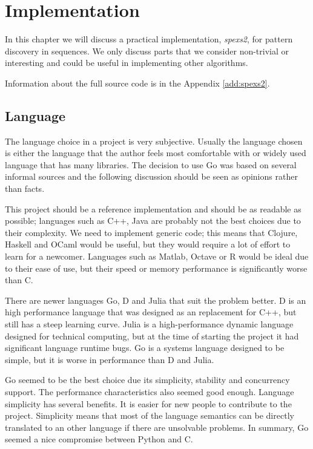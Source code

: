 \chapter{Implementation}
\label{c:implementation}

In this chapter we will discuss a practical implementation, \emph{spexs2}, for pattern discovery in sequences. We only discuss parts that we consider non-trivial or interesting and could be useful in implementing other algorithms.

Information about the full source code is in the Appendix \ref{add:spexs2}.

\section{Language}

The language choice in a project is very subjective. Usually the language chosen is either the language that the author feels most comfortable with or widely used language that has many libraries. The decision to use Go was based on several informal sources\cite{HammerPrinciple,LanguageShootout,LoopRecognition,go,clojure,julia} and the following discussion should be seen as opinions rather than facts.

This project should be a reference implementation and should be as readable as possible; languages such as C++, Java are probably not the best choices due to their complexity. We need to implement generic code; this means that Clojure, Haskell and OCaml would be useful, but they would require a lot of effort to learn for a newcomer. Languages such as Matlab, Octave or R would be ideal due to their ease of use, but their speed or memory performance is significantly worse than C.

There are newer languages Go, D and Julia that suit the problem better. D is an high performance language that was designed as an replacement for C++, but still has a steep learning curve. Julia is a high-performance dynamic language designed for technical computing, but at the time of starting the project it had significant language runtime bugs. Go is a systems language designed to be simple, but it is worse in performance than D and Julia.

Go seemed to be the best choice due its simplicity, stability and concurrency support. The performance characteristics also seemed good enough. Language simplicity has several benefits. It is easier for new people to contribute to the project. Simplicity means that most of the language semantics can be directly translated to an other language if there are unsolvable problems. In summary, Go seemed a nice compromise between Python and C.

